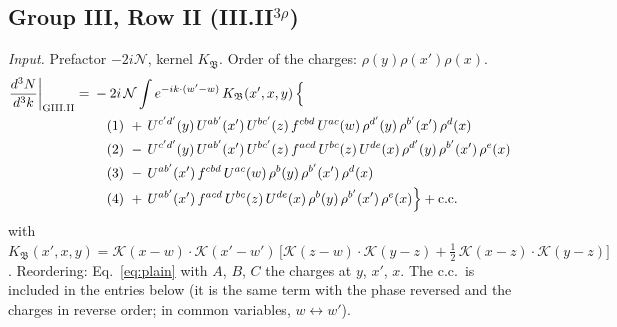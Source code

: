 \documentclass[10pt]{article}
\numberwithin{equation}{section}
\newcommand{\KK}{\mathcal K}
\newcommand{\NN}{\mathcal N}
\begin{document}
\subsection{Group III, Row II \texorpdfstring{(III.II$^{3\rho}$)}{}}\label{src:3:III.II}
\emph{Input.} Prefactor $-2i\NN$, kernel $K_{\mathfrak B}$. Order of the charges: $\rho(y)\rho(x')\rho(x)$.
\begin{align}
\frac{d^3N}{d^3k}\bigg|_{\rm GIII.II}={}&-2i\,\NN\int e^{-ik\cdot(w'-w)}\,K_{\mathfrak B}(x',x,y)\,\Big\{\notag\\
&\quad (1)\ +\,U^{c'd'}(y)\,U^{ab'}(x')\,U^{bc'}(z)\,f^{cbd}\,U^{ac}(w)\,\rho^{d'}(y)\,\rho^{b'}(x')\,\rho^{d}(x)\notag\\
&\quad (2)\ -\,U^{c'd'}(y)\,U^{ab'}(x')\,U^{bc'}(z)\,f^{acd}\,U^{bc}(z)\,U^{de}(x)\,\rho^{d'}(y)\,\rho^{b'}(x')\,\rho^{e}(x)\notag\\
&\quad (3)\ -\,U^{ab'}(x')\,f^{cbd}\,U^{ac}(w)\,\rho^{b}(y)\,\rho^{b'}(x')\,\rho^{d}(x)\notag\\
&\quad (4)\ +\,U^{ab'}(x')\,f^{acd}\,U^{bc}(z)\,U^{de}(x)\,\rho^{b}(y)\,\rho^{b'}(x')\,\rho^{e}(x)\Big\}+{\rm c.c.}\label{eq:in-GIII.II}
\end{align}
with $K_{\mathfrak B}(x',x,y)=\KK(x-w)\cdot\KK(x'-w')\,\Big[\KK(z-w)\cdot\KK(y-z)+\tfrac12\,\KK(x-z)\cdot\KK(y-z)\Big]$.
Reordering: Eq.~\eqref{eq:plain} with $A$, $B$, $C$ the charges at $y$, $x'$, $x$.
The c.c.\ is included in the entries below (it is the same term with the phase reversed and the charges in reverse order; in common variables, $w\leftrightarrow w'$).
\end{document}
